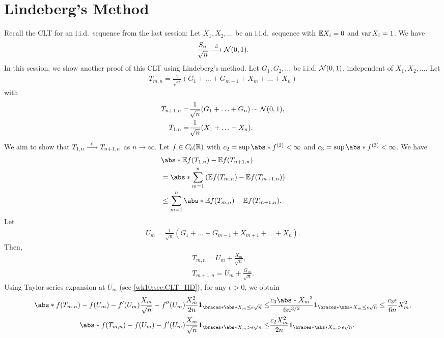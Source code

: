 \documentclass[12pt]{article}
\begin{document}

\section{Lindeberg's Method}
Recall the CLT for an i.i.d.\ sequence from the last session: Let $X_1, X_2, \ldots$ be an i.i.d.\ sequence with $\E X_i = 0$ and $\operatorname{var} X_i = 1$. We have
\begin{align*}
\frac{S_n}{\sqrt{n}} \stackrel{\mathrm{d}}{\longrightarrow} \mathcal{N} (0, 1).
\end{align*}
In this session, we show another proof of this CLT using Lindeberg's method. Let $G_1, G_2, \ldots$ be i.i.d. $\mathcal{N}(0, 1)$, independent of $X_1,X_2,\ldots$. Let
\begin{align*}
T_{m,n} = \frac{1}{\sqrt{n}} (G_1 + \ldots + G_{m-1} + X_m + \ldots + X_n)
\end{align*}
with
\begin{align*}
T_{n+1,n} =& \frac{1}{\sqrt{n}} (G_1 + \ldots + G_n) \sim \mathcal{N} (0, 1), \\
T_{1,n} =& \frac{1}{\sqrt{n}} (X_1 + \ldots + X_n).
\end{align*}
We aim to show that $T_{1,n} \stackrel{\mathrm{d}}{\longrightarrow} T_{n+1,n}$ as $n \to \infty$. Let $f \in C_b(\mathbb{R})$ with $c_2 = \sup \abs*{f\tc{2}} < \infty$ and $c_3 = \sup \abs*{f\tc{3}} < \infty$. We have
\begin{align*}
&\abs*{\E f(T_{1,n}) - \E f(T_{n+1,n})} \\
&= \abs*{ \sum_{m=1}^{n} \left( \E f(T_{m,n}) - \E f(T_{m+1,n}) \right)} \\
&\leq \sum_{m=1}^{n} \abs*{ \E f(T_{m,n}) - \E f(T_{m+1,n}) }.
\end{align*}
Let
\begin{align*}
U_m = \frac{1}{\sqrt{n}} \left(G_1 + \ldots + G_{m-1} + X_{m+1} + \ldots + X_n\right).
\end{align*}
Then,
\begin{align*}
T_{m,n} = U_m + \frac{X_m}{\sqrt{n}}, \\
T_{m+1,n} = U_m + \frac{G_m}{\sqrt{n}}.
\end{align*}
Using Taylor series expansion at $U_m$ (see \cref{wk10:sec:CLT_IID}), for any $\epsilon>0$, we obtain
\begin{align*}
\abs*{f(T_{m,n}) - f(U_m) - f'(U_m)\frac{X_m}{\sqrt{n}} - f''(U_m)\frac{X_m^2}{2n}} \indicator{\abs*{X_m} \leq \epsilon \sqrt{n}} 
\leq&
\frac{c_3\abs*{X_m}^3}{6n^{3/2}} \indicator{\abs*{X_m} \leq \epsilon \sqrt{n}}
\leq
\frac{c_3\epsilon}{6n} X_m^2, \\
%
\abs*{f(T_{m,n}) - f(U_m) - f'(U_m)\frac{X_m}{\sqrt{n}} } \indicator{\abs*{X_m} > \epsilon \sqrt{n}}
\leq&
\frac{c_2 X_m^2}{2n} \indicator{\abs*{X_m} > \epsilon \sqrt{n}}.
\end{align*}
\end{document}
